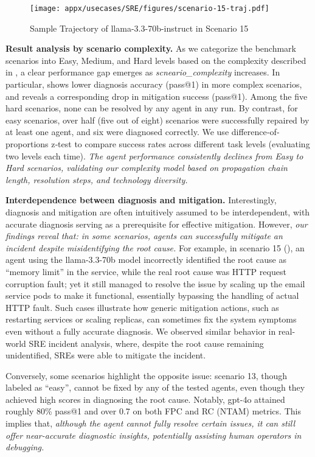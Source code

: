 \begin{figure}[ht]
    \centering
    \texttt{[image: appx/usecases/SRE/figures/scenario-15-traj.pdf]}
    \caption{Sample Trajectory of llama-3.3-70b-instruct in Scenario 15} 
    \label{fig:incident-15}
\end{figure} 

\textbf{Result analysis by scenario complexity.} 
As we categorize the benchmark scenarios into Easy, Medium, and Hard levels based on the complexity described in , a clear performance gap emerges as \textit{scneario\_complexity} increases. In particular,  shows lower diagnosis accuracy (pass@1) in more complex scenarios, and  reveals a corresponding drop in mitigation success (pass@1). Among the five hard scenarios, none can be resolved by any agent in any run. By contrast, for easy scenarios, over half (five out of eight) scenarios were successfully repaired by at least one agent, and six were diagnosed correctly. 
We use difference‐of‐proportions z‐test to compare success rates across different task levels (evaluating two levels each time). %
\textit{The agent performance consistently declines from Easy to Hard scenarios, validating our complexity model based on propagation chain length, resolution steps, and technology diversity.}

\textbf{Interdependence between diagnosis and mitigation.} Interestingly, diagnosis and mitigation are often intuitively assumed to be interdependent, with accurate diagnosis serving as a prerequisite for effective mitigation. However, \textit{our findings reveal that: in some scenarios, agents can successfully mitigate an incident despite misidentifying the root cause.} For example, in scenario 15 (), an agent using the llama-3.3-70b model incorrectly identified the root cause as ``memory limit'' in the service, while the real root cause was HTTP request corruption fault; yet it still managed to resolve the issue by scaling up the email service pods to make it functional, essentially bypassing the handling of actual HTTP fault. Such cases illustrate how generic mitigation actions, such as restarting services or scaling replicas, can sometimes fix the system symptoms even without a fully accurate diagnosis. We observed similar behavior in real-world SRE incident analysis, where, despite the root cause remaining unidentified, SREs were able to mitigate the incident.

Conversely, some scenarios highlight the opposite issue: scenario 13, though labeled as ``easy'', cannot be fixed by any of the tested agents, even though they achieved high scores in diagnosing the root cause. Notably, gpt-4o attained roughly 80\% pass@1 and over 0.7 on both FPC and RC (NTAM) metrics. This implies that, \textit{although the agent cannot fully resolve certain issues, it can still offer near-accurate diagnostic insights, potentially assisting human operators in debugging.} 

